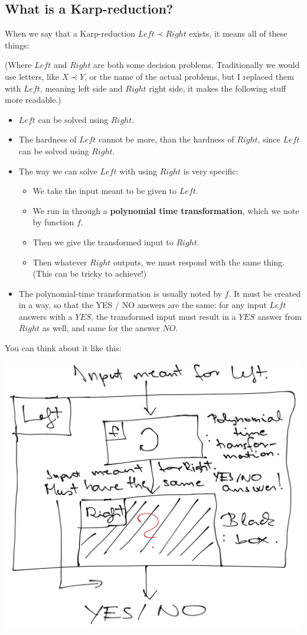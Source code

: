 \subsection{What is a Karp-reduction?}

When we say that a Karp-reduction $Left \prec Right$ exists, it means all of these things:

(Where $Left$ and $Right$ are both some decision problems. Traditionally we would use letters, like $X \prec Y$, or the name of the actual problems, but I replaced them with $Left$, meaning left side and $Right$ right side, it makes the following stuff more readable.)

\begin{itemize}
    \item $Left$ can be solved using $Right$.
    \item The hardness of $Left$ cannot be more, than the hardness of $Right$, since $Left$ can be solved using $Right$.
    \item The way we can solve $Left$ with using $Right$ is very specific:
    \begin{itemize}
        \item We take the input meant to be given to $Left$.
        \item We run in through a \textbf{polynomial time transformation}, which we note by function $f$.
        \item Then we give the transformed input to $Right$.
        \item Then whatever $Right$ outputs, we must respond with the same thing. (This can be tricky to achieve!)
    \end{itemize}
    \item The polynomial-time transformation is usually noted by $f$. It must be created in a way, so that the YES / NO answers are the same: for any input $Left$ answers with a $YES$, the transformed input must result in a $YES$ answer from $Right$ as well, and same for the answer $NO$.
\end{itemize}

You can think about it like this:

\begin{center}
    \includegraphics[width=0.8\linewidth]{08/01/karp_reduction.png}
\end{center}

